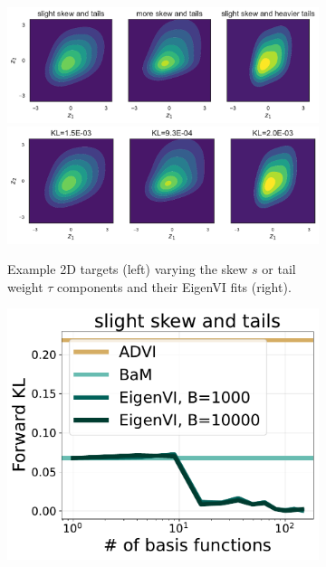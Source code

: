 \begin{figure}[t]
    \centering
    \begin{subfigure}[b]{\linewidth}
    \centering
    \includegraphics[scale=0.32]{figs/expts-2d-new/sinh-varied2.pdf}
    \includegraphics[scale=0.32]{figs/expts-2d-new/sinh-varied2-fits.pdf}
    \caption{Example 2D targets (left)  varying the skew $s$ or tail weight $\tau$
    components and their EigenVI fits (right).
    }
    \label{fig:sinh2dtargets}
\hspace{10pt}
    \end{subfigure}
    \begin{subfigure}[b]{\linewidth}
        \centering
    \includegraphics[scale=0.21]{figs/expts-2d/sinh-2D-P1-new.pdf}

\end{subfigure}
\end{figure}
